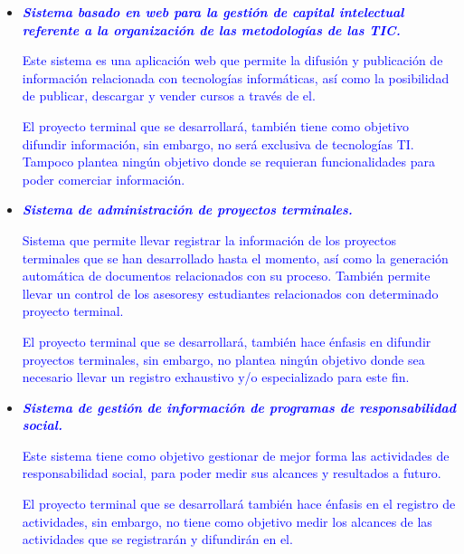 \documentclass[11pt,letterpaper,titlepage]{article}
\begin{document}
\begin{itemize}

  \item \textcolor{blue}{\textit{\textbf{Sistema basado en web para la gesti\'on de capital intelectual referente a la organizaci\'on de las metodolog\'ias de las TIC.}}}

\textcolor{blue}{Este sistema es una aplicaci\'on web que permite la difusi\'on y publicaci\'on de informaci\'on relacionada con tecnolog\'ias inform\'aticas, as\'i como la posibilidad de publicar, descargar y vender cursos a trav\'es de el.}

\textcolor{blue}{El proyecto terminal que se desarrollar\'a, tambi\'en tiene como objetivo difundir informaci\'on, sin embargo, no ser\'a exclusiva de tecnolog\'ias TI. Tampoco plantea ning\'un objetivo donde se requieran funcionalidades para poder comerciar informaci\'on.}

  \item \textcolor{blue}{\textit{\textbf{Sistema de administraci\'on de proyectos terminales.}}}

\textcolor{blue}{Sistema que permite llevar registrar la informaci\'on de los proyectos terminales que se han desarrollado hasta el momento, as\'i como la generaci\'on autom\'atica de documentos relacionados con su proceso. Tambi\'en permite llevar un control de los asesoresy estudiantes relacionados con determinado proyecto terminal.}

\textcolor{blue}{El proyecto terminal que se desarrollar\'a, tambi\'en hace \'enfasis en difundir proyectos terminales, sin embargo, no plantea ning\'un objetivo donde sea necesario llevar un registro exhaustivo y/o especializado para este fin.}

  \item \textcolor{blue}{\textit{\textbf{Sistema de gesti\'on de información de programas de responsabilidad social.}}}

\textcolor{blue}{Este sistema tiene como objetivo gestionar de mejor forma las actividades de responsabilidad social, para poder medir sus alcances y resultados a futuro.}

\textcolor{blue}{El proyecto terminal que se desarrollar\'a tambi\'en hace \'enfasis en el registro de actividades, sin embargo, no tiene como objetivo medir los alcances de las actividades que se registrar\'an y difundir\'an en el.}



\end{itemize}
\end{document}
